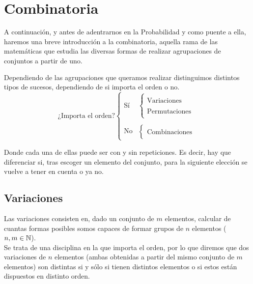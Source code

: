 \chapter{Combinatoria}

A continuación, y antes de adentrarnos en la Probabilidad y como puente a ella, haremos una breve introducción a la combinatoria, aquella rama de las matemáticas que estudia las diversas formas de realizar agrupaciones de conjuntos a partir de uno.

Dependiendo de las agrupaciones que queramos realizar distinguimos distintos tipos de sucesos, dependiendo de si importa el orden o no.
\begin{equation*}
    \text{¿Importa el orden?} \left\{
    \begin{array}{ll}
        \text{Sí} &\left\{
            \begin{array}{l}
                ~ \\
                \text{Variaciones}\\
                ~\\
                \text{Permutaciones}\\
                ~
            \end{array}
        \right.\\
        ~ \\
        \text{No}&\left\{
            \begin{array}{l}
                ~ \\
                \text{Combinaciones}\\
                ~
            \end{array}
        \right.
    \end{array}
    \right.
\end{equation*}

Donde cada una de ellas puede ser con y sin repeticiones. Es decir, hay que diferenciar si, tras escoger un elemento del conjunto, para la siguiente elección se vuelve a tener en cuenta o ya no.

\section{Variaciones}

Las variaciones consisten en, dado un conjunto de $m$ elementos, calcular de cuantas formas posibles somos capaces de formar grupos de $n$ elementos ($n, m\in \mathbb N$).\\

Se trata de una disciplina en la que importa el orden, por lo que diremos que dos variaciones de $n$ elementos
(ambas obtenidas a partir del mismo conjunto de $m$ elementos) son distintas si y sólo si tienen distintos
elementos o si estos están dispuestos en distinto orden.\\

